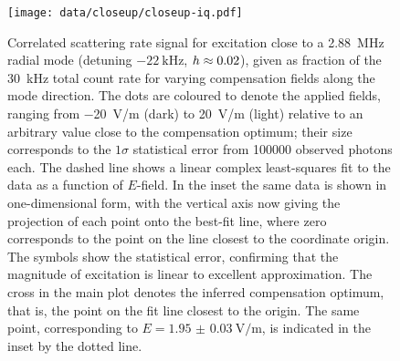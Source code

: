 \documentclass[pra,twocolumn]{revtex4-2}
\begin{document}
\begin{figure}
	\centering
	\texttt{[image: data/closeup/closeup-iq.pdf]}
	\caption{
		Correlated scattering rate signal for excitation close to a \SI{2.88}{\mega\hertz} radial mode (detuning $-\SI{22}{\kilo\hertz}$, $h \approx 0.02$),  given as fraction of the \SI{30}{\kilo\hertz} total count rate for varying compensation fields along the mode direction.
		The dots are coloured to denote the applied fields, ranging from \SI{-20}{\volt / \metre} (dark) to \SI{20}{\volt / \metre} (light) relative to an arbitrary value close to the compensation optimum; their size corresponds to the $1 \sigma$ statistical error from \num{100000} observed photons each.
		The dashed line shows a linear complex least-squares fit to the data as a function of $E$-field.
		In the inset the same data is shown in one-dimensional form, with the vertical axis now giving the projection of each point onto the best-fit line, where zero corresponds to the point on the line closest to the coordinate origin.
		The symbols show the statistical error, confirming that the magnitude of excitation is linear to excellent approximation.
		The cross in the main plot denotes the inferred compensation optimum, that is, the point on the fit line closest to the origin.
		The same point, corresponding to $E = \SI{1.95(3)}{\volt / \metre}$, is indicated in the inset by the dotted line.
	}
	\label{fig:closeup}
\end{figure}
\end{document}
